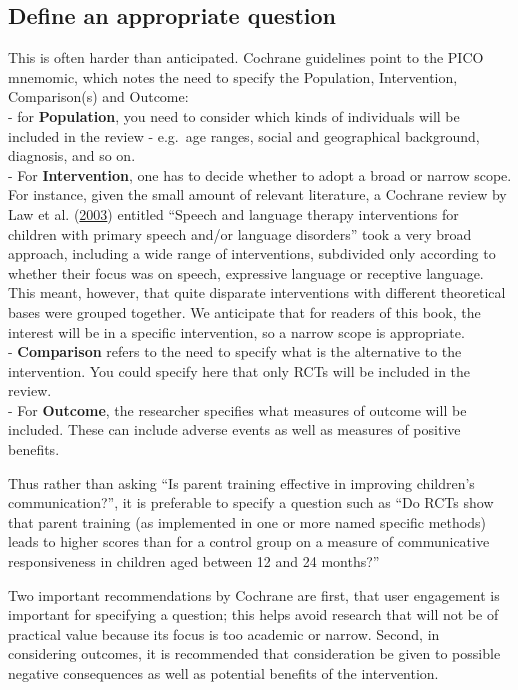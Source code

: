 \documentclass{krantz}
\begin{document}
\hypertarget{define-an-appropriate-question}{%
\subsection{Define an appropriate question}\label{define-an-appropriate-question}}

This is often harder than anticipated. Cochrane guidelines point to the PICO mnemomic, which notes the need to specify the Population, Intervention, Comparison(s) and Outcome:\\
- for \textbf{Population}, you need to consider which kinds of individuals will be included in the review - e.g.~age ranges, social and geographical background, diagnosis, and so on.\\
- For \textbf{Intervention}, one has to decide whether to adopt a broad or narrow scope. For instance, given the small amount of relevant literature, a Cochrane review by Law et al. (\protect\hyperlink{ref-law2003}{2003}) entitled ``Speech and language therapy interventions for children with primary speech and/or language disorders'' took a very broad approach, including a wide range of interventions, subdivided only according to whether their focus was on speech, expressive language or receptive language. This meant, however, that quite disparate interventions with different theoretical bases were grouped together. We anticipate that for readers of this book, the interest will be in a specific intervention, so a narrow scope is appropriate.\\
- \textbf{Comparison} refers to the need to specify what is the alternative to the intervention. You could specify here that only RCTs will be included in the review.\\
- For \textbf{Outcome}, the researcher specifies what measures of outcome will be included. These can include adverse events as well as measures of positive benefits.

Thus rather than asking ``Is parent training effective in improving children's communication?'', it is preferable to specify a question such as ``Do RCTs show that parent training (as implemented in one or more named specific methods) leads to higher scores than for a control group on a measure of communicative responsiveness in children aged between 12 and 24 months?''

Two important recommendations by Cochrane are first, that user engagement is important for specifying a question; this helps avoid research that will not be of practical value because its focus is too academic or narrow. Second, in considering outcomes, it is recommended that consideration be given to possible negative consequences as well as potential benefits of the intervention.
\end{document}
